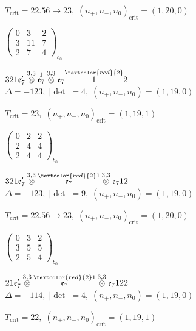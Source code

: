 \documentclass[10pt]{article}
\begin{document}
\hspace{1em}$T_{\text{crit}}=22.56 \to 23,\; (n_+,n_-,n_0)_{\text{crit}}=(1,20,0)$

\hspace{2em}$\left(\begin{smallmatrix}0 & 3 & 2 \\ 3 & 11 & 7 \\ 2 & 7 & 4\end{smallmatrix}\right)_{\!b_0}$

\smallskip

$321\mathfrak{e}_7'\overset{3,3}{\otimes}\overset{1}{\mathfrak{e}_7}\overset{3,3}{\otimes}\mathfrak{e}_7\overset{\textcolor{red}{2}}{1}2$ \quad $\Delta=-123,\; |\det|=4,\; (n_+,n_-,n_0)=(1,19,0)$

\hspace{1em}$T_{\text{crit}}=23,\; (n_+,n_-,n_0)_{\text{crit}}=(1,19,1)$

\hspace{2em}$\left(\begin{smallmatrix}0 & 2 & 2 \\ 2 & 4 & 4 \\ 2 & 4 & 4\end{smallmatrix}\right)_{\!b_0}$

$321\mathfrak{e}_7'\overset{3,3}{\otimes}\overset{\textcolor{red}{2}1}{\mathfrak{e}_7}\overset{3,3}{\otimes}\mathfrak{e}_712$ \quad $\Delta=-123,\; |\det|=9,\; (n_+,n_-,n_0)=(1,19,0)$

\hspace{1em}$T_{\text{crit}}=22.56 \to 23,\; (n_+,n_-,n_0)_{\text{crit}}=(1,20,0)$

\hspace{2em}$\left(\begin{smallmatrix}0 & 3 & 2 \\ 3 & 5 & 5 \\ 2 & 5 & 4\end{smallmatrix}\right)_{\!b_0}$

\smallskip

$21\mathfrak{e}_7'\overset{3,3}{\otimes}\overset{\textcolor{red}{2}1}{\mathfrak{e}_7}\overset{3,3}{\otimes}\mathfrak{e}_7122$ \quad $\Delta=-114,\; |\det|=4,\; (n_+,n_-,n_0)=(1,19,0)$

\hspace{1em}$T_{\text{crit}}=22,\; (n_+,n_-,n_0)_{\text{crit}}=(1,19,1)$
\end{document}
